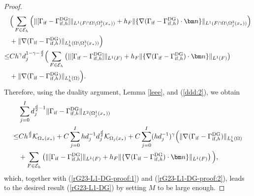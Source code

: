 \documentclass[1996/10/24]{amsart}
\theoremstyle{definition}
\numberwithin{equation}{section}
\begin{document}
\begin{proof}
\begin{align*}
&\Big(\sum_{F\in\mathcal{E}_h}\left(
\|[\Gamma_{{\rm if}}-\Gamma_{{\rm if},h}^{{\rm DG}}]\|_{L^1(F\cap\Omega\backslash\Omega_j^3(x_{\ast}))}+h_F\|\{\nabla(\Gamma_{{\rm if}}-\Gamma_{{\rm if},h}^{{\rm DG}})\cdot{\bm n}\}\|_{L^1(F\cap\Omega\backslash\Omega_j^3(x_{\ast}))}\right)\\
&+\|\nabla(\Gamma_{{\rm if}}-\Gamma_{{\rm if},h}^{{\rm DG}})\|_{L_h^1(\Omega\backslash\Omega_j^3(x_{\ast}))}\Big)\\
\leq&Ch^{\gamma}d_j^{1-\gamma-\frac{d}{2}}\Big(\sum_{F\in\mathcal{E}_h}\left(
\|[\Gamma_{{\rm if}}-\Gamma_{{\rm if},h}^{{\rm DG}}]\|_{L^1(F)}+h_F\|\{\nabla(\Gamma_{{\rm if}}-\Gamma_{{\rm if},h}^{{\rm DG}})\cdot{\bm n}\}\|_{L^1(F)}\right)\\
&+\|\nabla(\Gamma_{{\rm if}}-\Gamma_{{\rm if},h}^{{\rm DG}})\|_{L_h^1(\Omega)}\Big).
\end{align*}
Therefore, using the duality argument, Lemma \ref{leee}, and (\ref{ddd:2}), we obtain
\begin{align*}
&\sum_{j=0}^Id_j^{\frac{d}{2}-1}\|\Gamma_{{\rm if}}-\Gamma_{{\rm if},h}^{{\rm DG}}\|_{L^2(\Omega_j^1(x_{\ast}))}\\
\leq&Ch^{\frac{d}{2}}\mathcal{K}_{\Omega_{\ast}(x_{\ast})}+ C\sum_{j=0}^Ihd_j^{-1}d_j^{\frac{d}{2}}\mathcal{K}_{\Omega_j(x_{\ast})}+C\sum_{j=0}^I(hd_j^{-1})^{\gamma}\Big(\|\nabla(\Gamma_{{\rm if}}-\Gamma_{{\rm if},h}^{{\rm DG}})\|_{L_h^1(\Omega)}\\
&+\sum_{F\in\mathcal{E}_h}\left(\|[\Gamma_{{\rm if}}-\Gamma_{{\rm if},h}^{{\rm DG}}]\|_{L^1(F)}+h_F\|\{\nabla(\Gamma_{{\rm if}}-\Gamma_{{\rm if},h}^{{\rm DG}})\cdot{\bm n}\}\|_{L^1(F)}\right)\Big),
\end{align*}
which, together with (\ref{rG23-L1-DG-proof:1}) and (\ref{rG23-L1-DG-proof:2}), leads to the desired result (\ref{rG23-L1-DG}) by setting $M$ to be large enough.


\end{proof}
\end{document}
